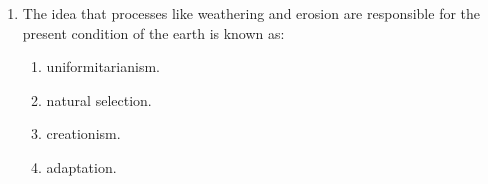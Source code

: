 \documentclass[12pt]{article}
\begin{document}
\begin{enumerate}[label=\arabic*.]
\begin{enumerate}[label=(\alph*)]
    \item around 75 substantial settlements and more than 300 smaller communities.
    \item more than 500 towns and villages with monumental architecture.
    \item between 30 and 40 farmsteads and three large pueblos.
    \item one large city state with more than 300 outlying farmsteads.
\end{enumerate}
\item The idea that processes like weathering and erosion are responsible for the present condition of the earth is known as:
\begin{enumerate}[label=(\alph*)]
    \item uniformitarianism.
    \item natural selection.
    \item creationism.
    \item adaptation.
\end{enumerate}
\end{enumerate}
\end{document}
